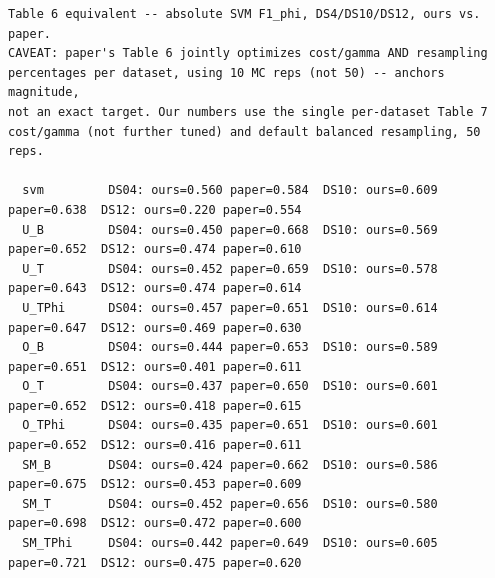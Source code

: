 \begingroup
{}
\label{tab:exp002_cmp_cmp_table6}
\tiny
\begin{verbatim}
Table 6 equivalent -- absolute SVM F1_phi, DS4/DS10/DS12, ours vs. paper.
CAVEAT: paper's Table 6 jointly optimizes cost/gamma AND resampling
percentages per dataset, using 10 MC reps (not 50) -- anchors magnitude,
not an exact target. Our numbers use the single per-dataset Table 7
cost/gamma (not further tuned) and default balanced resampling, 50 reps.

  svm         DS04: ours=0.560 paper=0.584  DS10: ours=0.609 paper=0.638  DS12: ours=0.220 paper=0.554
  U_B         DS04: ours=0.450 paper=0.668  DS10: ours=0.569 paper=0.652  DS12: ours=0.474 paper=0.610
  U_T         DS04: ours=0.452 paper=0.659  DS10: ours=0.578 paper=0.643  DS12: ours=0.474 paper=0.614
  U_TPhi      DS04: ours=0.457 paper=0.651  DS10: ours=0.614 paper=0.647  DS12: ours=0.469 paper=0.630
  O_B         DS04: ours=0.444 paper=0.653  DS10: ours=0.589 paper=0.651  DS12: ours=0.401 paper=0.611
  O_T         DS04: ours=0.437 paper=0.650  DS10: ours=0.601 paper=0.652  DS12: ours=0.418 paper=0.615
  O_TPhi      DS04: ours=0.435 paper=0.651  DS10: ours=0.601 paper=0.652  DS12: ours=0.416 paper=0.611
  SM_B        DS04: ours=0.424 paper=0.662  DS10: ours=0.586 paper=0.675  DS12: ours=0.453 paper=0.609
  SM_T        DS04: ours=0.452 paper=0.656  DS10: ours=0.580 paper=0.698  DS12: ours=0.472 paper=0.600
  SM_TPhi     DS04: ours=0.442 paper=0.649  DS10: ours=0.605 paper=0.721  DS12: ours=0.475 paper=0.620
\end{verbatim}
\endgroup
